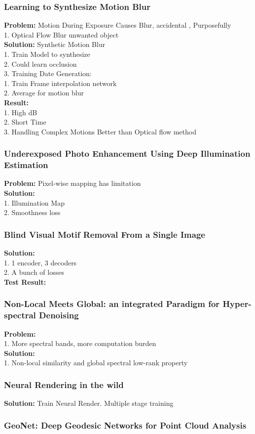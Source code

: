\subsubsection{Learning to Synthesize Motion Blur}
    {\bf Problem:} Motion During Exposure Causes Blur, accidental , Purposefully  \\
        1. Optical Flow Blur unwanted object  \\
    {\bf Solution:} Synthetic Motion Blur \\
        1. Train Model to synthesize \\
        2. Could learn occlusion \\
        3. Training Date Generation: \\
            1. Train Frame interpolation network \\
            2. Average for motion blur \\
    {\bf Result:} \\
        1. High dB \\
        2. Short Time \\
        3. Handling Complex Motions Better than Optical flow method \\
\subsubsection{Underexposed Photo Enhancement Using Deep Illumination Estimation}
    {\bf Problem:} Pixel-wise mapping has limitation \\
    {\bf Solution:}  \\
        1. Illumination Map \\
        2. Smoothness loss \\
\subsubsection{Blind Visual Motif Removal From a Single Image}
    {\bf Solution:}  \\
        1. 1 encoder, 3 decoders \\
        2. A bunch of losses \\
    {\bf Test Result:} \\
\subsubsection{Non-Local Meets Global: an integrated Paradigm for Hyper-spectral Denoising}
    {\bf Problem:}  \\
        1. More spectral bands, more computation burden \\
    {\bf Solution:}  \\
        1. Non-local similarity and global spectral low-rank property \\
\subsubsection{Neural Rendering in the wild}
    {\bf Solution:} Train Neural Render. Multiple stage training \\
\subsubsection{GeoNet: Deep Geodesic Networks for Point Cloud Analysis}
